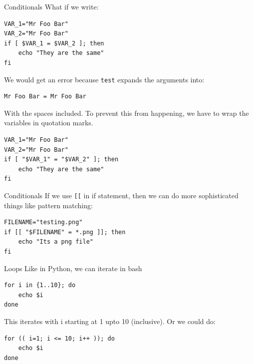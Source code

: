 \documentclass[10pt]{beamer}
\begin{document}
\begin{frame}[label={sec:orgb22020f},fragile]{Conditionals}
 What if we write:

\begin{verbatim}
VAR_1="Mr Foo Bar"
VAR_2="Mr Foo Bar"
if [ $VAR_1 = $VAR_2 ]; then
    echo "They are the same"
fi
\end{verbatim}

We would get an error because \texttt{test} expands the arguments into:

\begin{verbatim}
Mr Foo Bar = Mr Foo Bar
\end{verbatim}

With the spaces included. To prevent this from happening, we have to wrap the
variables in quotation marks.

\begin{verbatim}
VAR_1="Mr Foo Bar"
VAR_2="Mr Foo Bar"
if [ "$VAR_1" = "$VAR_2" ]; then
    echo "They are the same"
fi
\end{verbatim}
\end{frame}

\begin{frame}[label={sec:org386b3f4},fragile]{Conditionals}
 If we use \texttt{[[} in if statement, then we can do more sophisticated things like
pattern matching:

\begin{verbatim}
FILENAME="testing.png"
if [[ "$FILENAME" = *.png ]]; then
    echo "Its a png file"
fi
\end{verbatim}
\end{frame}

\begin{frame}[label={sec:org3463061},fragile]{Loops}
 Like in Python, we can iterate in bash

\begin{verbatim}
for i in {1..10}; do
    echo $i
done
\end{verbatim}

This iterates with i starting at 1 upto 10 (inclusive). Or we could do:

\begin{verbatim}
for (( i=1; i <= 10; i++ )); do
    echo $i
done
\end{verbatim}
\end{frame}
\end{document}
